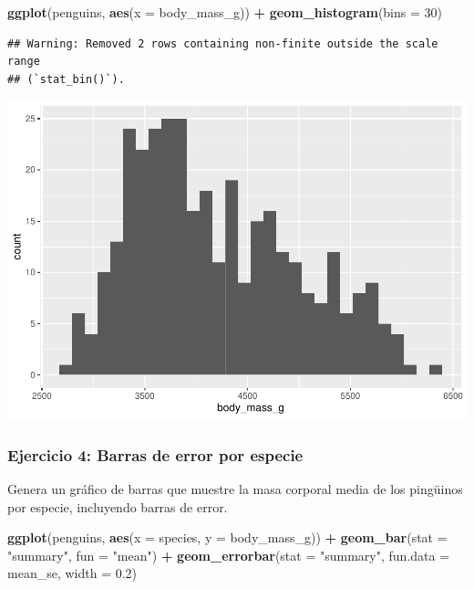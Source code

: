 \documentclass[
]{book}
\newenvironment{Shaded}{\begin{snugshade}}{\end{snugshade}}
\newcommand{\AttributeTok}[1]{\textcolor[rgb]{0.13,0.29,0.53}{#1}}
\newcommand{\DecValTok}[1]{\textcolor[rgb]{0.00,0.00,0.81}{#1}}
\newcommand{\FloatTok}[1]{\textcolor[rgb]{0.00,0.00,0.81}{#1}}
\newcommand{\FunctionTok}[1]{\textcolor[rgb]{0.13,0.29,0.53}{\textbf{#1}}}
\newcommand{\NormalTok}[1]{#1}
\newcommand{\SpecialCharTok}[1]{\textcolor[rgb]{0.81,0.36,0.00}{\textbf{#1}}}
\newcommand{\StringTok}[1]{\textcolor[rgb]{0.31,0.60,0.02}{#1}}
\begin{document}
\begin{Shaded}
\begin{Highlighting}[]
\FunctionTok{ggplot}\NormalTok{(penguins, }\FunctionTok{aes}\NormalTok{(}\AttributeTok{x =}\NormalTok{ body\_mass\_g)) }\SpecialCharTok{+}
  \FunctionTok{geom\_histogram}\NormalTok{(}\AttributeTok{bins =} \DecValTok{30}\NormalTok{)}
\end{Highlighting}
\end{Shaded}

\begin{verbatim}
## Warning: Removed 2 rows containing non-finite outside the scale range
## (`stat_bin()`).
\end{verbatim}

\includegraphics{bookdown-demo_files/figure-latex/unnamed-chunk-183-1.pdf}

\subsubsection{Ejercicio 4: Barras de error por especie}\label{ejercicio-4-barras-de-error-por-especie}

Genera un gráfico de barras que muestre la masa corporal media de los pingüinos por especie, incluyendo barras de error.

\begin{Shaded}
\begin{Highlighting}[]
\FunctionTok{ggplot}\NormalTok{(penguins, }\FunctionTok{aes}\NormalTok{(}\AttributeTok{x =}\NormalTok{ species, }\AttributeTok{y =}\NormalTok{ body\_mass\_g)) }\SpecialCharTok{+}
  \FunctionTok{geom\_bar}\NormalTok{(}\AttributeTok{stat =} \StringTok{"summary"}\NormalTok{, }\AttributeTok{fun =} \StringTok{"mean"}\NormalTok{) }\SpecialCharTok{+}
  \FunctionTok{geom\_errorbar}\NormalTok{(}\AttributeTok{stat =} \StringTok{"summary"}\NormalTok{, }\AttributeTok{fun.data =}\NormalTok{ mean\_se, }\AttributeTok{width =} \FloatTok{0.2}\NormalTok{)}
\end{Highlighting}
\end{Shaded}
\end{document}
